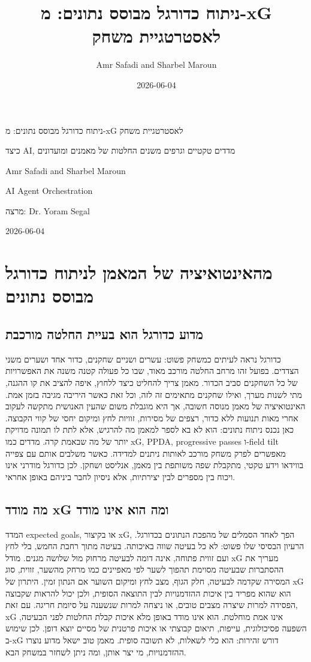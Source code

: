 \documentclass[11pt]{report}
\title{ניתוח כדורגל מבוסס נתונים: מ-xG לאסטרטגיית משחק}
\author{Amr Safadi and Sharbel Maroun}
\date{2026-06-04}
\begin{document}
\begin{titlepage}
\centering
\vspace*{3cm}
{\Huge ניתוח כדורגל מבוסס נתונים: מ-xG לאסטרטגיית משחק\par}
\vspace{0.6cm}
{\Large כיצד AI, מדדים טקטיים וגרפים משנים החלטות של מאמנים ומועדונים\par}
\vspace{2.5cm}
{\large Amr Safadi and Sharbel Maroun\par}
\vspace{0.4cm}
{\large AI Agent Orchestration\par}
{\large מרצה: Dr. Yoram Segal\par}
\vspace{0.4cm}
{\large 2026-06-04\par}
\end{titlepage}\tableofcontents
\chapter{מהאינטואיציה של המאמן לניתוח כדורגל מבוסס נתונים}
\section{מדוע כדורגל הוא בעיית החלטה מורכבת}
כדורגל נראה לעיתים כמשחק פשוט: עשרים ושניים שחקנים, כדור אחד ושערים משני הצדדים. בפועל זהו מרחב החלטה מורכב מאוד, שבו כל פעולה קטנה משנה את האפשרויות של כל השחקנים סביב הכדור. מאמן צריך להחליט כיצד ללחוץ, איפה להציב את קו ההגנה, מתי לשנות מערך, ואילו שחקנים מתאימים זה לזה, וכל זאת כאשר היריבה מגיבה בזמן אמת. האינטואיציה של מאמן מנוסה חשובה, אך היא מוגבלת משום שהעין האנושית מתקשה לעקוב אחרי מאות תנועות ללא כדור, רצפים של מסירות, זוויות לחץ ומיקום יחסי של קווי הקבוצה. כאן נכנס ניתוח נתונים: הוא לא בא לספר למאמן מה להרגיש, אלא לתת לו תמונה מדויקת יותר של מה שבאמת קרה. מדדים כמו xG, PPDA, progressive passes ו-field tilt מאפשרים לפרק משחק מורכב לאותות ניתנים למדידה. כאשר משלבים אותם עם צפייה בווידאו וידע טקטי, מתקבלת שפה משותפת בין מאמן, אנליסט ושחקן. לכן כדורגל מודרני אינו ויכוח בין מספרים לבין יצירתיות, אלא ניסיון לחבר ביניהם באופן אחראי.

\section{מה מודד xG ומה הוא אינו מודד}
המדד expected goals, או בקיצור xG, הפך לאחד הסמלים של מהפכת הנתונים בכדורגל. הרעיון הבסיסי שלו פשוט: לא כל בעיטה שווה באיכותה. בעיטה מתוך רחבת החמש, בלי לחץ ועם זווית פתוחה, אינה דומה לבעיטה מרחוק מול שלושה מגנים. מודל xG מעריך את ההסתברות שבעיטה מסוימת תהפוך לשער לפי מאפיינים כמו מרחק מהשער, זווית, סוג המסירה שקדמה לבעיטה, חלק הגוף, מצב לחץ ומיקום השוער אם הנתון זמין. היתרון של xG הוא שהוא מפריד בין איכות ההזדמנויות לבין התוצאה הסופית, ולכן יכול להראות שקבוצה הפסידה למרות שיצרה מצבים טובים, או ניצחה למרות שנשענה על סיומת חריגה. עם זאת, xG אינו אמת מוחלטת. הוא אינו מודד באופן מלא איכות קבלת החלטות לפני הבעיטה, השפעה פסיכולוגית, עייפות, תיאום קבוצתי או איכות פרטנית של מסיים יוצא דופן. לכן שימוש ב-xG דורש זהירות: הוא כלי לשאלות, לא תשובה סופית. מאמן טוב ישאל מדוע נוצרו ההזדמנויות, מי יצר אותן, ומה ניתן לשחזר במשחק הבא.
\end{document}
